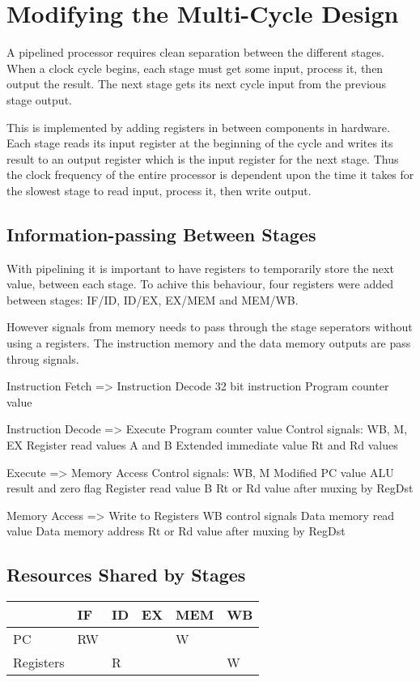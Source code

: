 \section{Modifying the Multi-Cycle Design}
A pipelined processor requires clean separation between the different stages.
When a clock cycle begins, each stage must get some input, process it, then output the result.
The next stage gets its next cycle input from the previous stage output.

This is implemented by adding registers in between components in hardware.
Each stage reads its input register at the beginning of the cycle and writes its result to an output register which is the input register for the next stage.
Thus the clock frequency of the entire processor is dependent upon the time it takes for the slowest stage to read input, process it, then write output.

\subsection{Information-passing Between Stages}
With pipelining it is important to have registers to temporarily store the next value,
between each stage.
To achive this behaviour, four registers were added between stages:
IF/ID, ID/EX, EX/MEM and MEM/WB.

However signals from memory needs to pass through the stage seperators without using a registers.
The instruction memory and the data memory outputs are pass throug signals.




Instruction Fetch => Instruction Decode
32 bit instruction
Program counter value

Instruction Decode => Execute
Program counter value
Control signals: WB, M, EX
Register read values A and B
Extended immediate value
Rt and Rd values

Execute => Memory Access
Control signals: WB, M
Modified PC value
ALU result and zero flag
Register read value B
Rt or Rd value after muxing by RegDst

Memory Access => Write to Registers
WB control signals
Data memory read value
Data memory address
Rt or Rd value after muxing by RegDst

\subsection{Resources Shared by Stages}
\begin{table}[h]
    \begin{tabular}{l|lllll}
    ~         & IF & ID & EX & MEM & WB \\ \hline
    PC        & RW & ~  & ~  & W   & ~  \\
    Registers & ~  & R  & ~  & ~   & W  \\
    \end{tabular}
\end{table}
